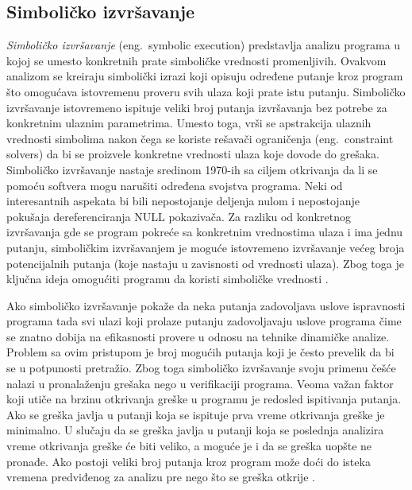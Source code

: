 \documentclass[12pt,oneside]{memoir}
\begin{document}
\subsection{Simboličko izvršavanje}
\textit{Simboličko izvršavanje} (eng.~symbolic execution) predstavlja analizu programa u kojoj se umesto konkretnih prate simboličke vrednosti promenljivih. Ovakvom analizom se kreiraju simbolički izrazi koji opisuju određene putanje kroz program što omogućava istovremenu proveru svih ulaza koji prate istu putanju. Simboličko izvršavanje istovremeno ispituje veliki broj putanja izvršavanja bez potrebe za konkretnim ulaznim parametrima. Umesto toga, vrši se apstrakcija ulaznih vrednosti simbolima nakon čega se koriste rešavači ograničenja (eng.~constraint solvers) da bi se proizvele konkretne vrednosti ulaza koje dovode do grešaka. Simboličko izvršavanje nastaje sredinom 1970-ih sa ciljem otkrivanja da li se pomoću softvera mogu narušiti određena svojstva programa. Neki od interesantnih aspekata bi bili nepostojanje deljenja nulom i nepostojanje pokušaja dereferenciranja NULL pokazivača. Za razliku od konkretnog izvršavanja gde se program pokreće sa konkretnim vrednostima ulaza i ima jednu putanju, simboličkim izvršavanjem je moguće istovremeno izvršavanje većeg broja potencijalnih putanja (koje nastaju u zavisnosti od vrednosti ulaza). Zbog toga je ključna ideja omogućiti programu da koristi simboličke vrednosti \cite{mvj, SurveySymExec}. 

Ako simboličko izvršavanje pokaže da neka putanja zadovoljava uslove ispravnosti programa tada svi ulazi koji prolaze putanju zadovoljavaju uslove programa čime se znatno dobija na efikasnosti provere u odnosu na tehnike dinamičke analize. Problem sa ovim pristupom je broj mogućih putanja koji je često prevelik da bi se u potpunosti pretražio. Zbog toga simboličko izvršavanje svoju primenu češće nalazi  u pronalaženju grešaka nego u verifikaciji programa. Veoma važan faktor koji utiče na brzinu otkrivanja greške u programu je redosled ispitivanja putanja. Ako se greška javlja u putanji koja se ispituje prva vreme otkrivanja greške je minimalno. U slučaju da se greška javlja u putanji koja se poslednja analizira vreme otkrivanja greške će biti veliko, a moguće je i da se greška uopšte ne pronađe. Ako postoji veliki broj putanja kroz program može doći do isteka vremena predviđenog za analizu pre nego što se greška otkrije \cite{mvj}.
\end{document}
